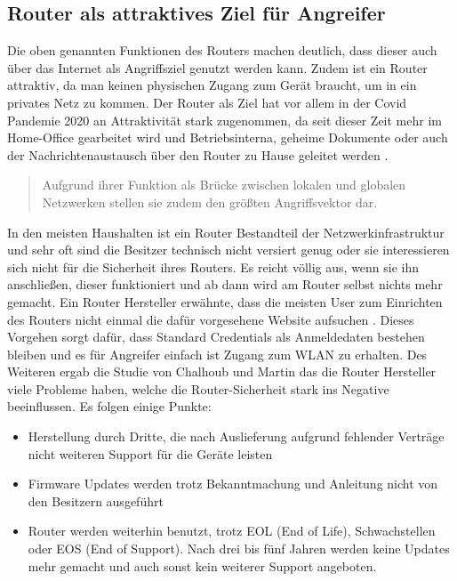 	\subsection{Router als attraktives Ziel für Angreifer}
	\label{sec:attractiv_target}
	Die oben genannten Funktionen des Routers machen deutlich, dass dieser auch
	über das Internet als Angriffsziel genutzt werden kann. Zudem ist ein Router
	attraktiv, da man keinen physischen Zugang zum Gerät braucht, um in ein 
	privates Netz zu kommen. Der Router als Ziel hat vor allem in der Covid 
	Pandemie 2020 an Attraktivität stark zugenommen, da seit dieser Zeit mehr im 
	Home-Office gearbeitet wird und Betriebsinterna, geheime Dokumente oder
	auch der Nachrichtenaustausch über den Router zu Hause geleitet werden
	\cite{chalhoub2023, schwarz2021}.
	\begin{quote}
		Aufgrund ihrer Funktion als Brücke zwischen lokalen und globalen 
		Netzwerken stellen sie zudem den größten Angriffsvektor dar.
		\cite{schwarz2021}
	\end{quote}
	In den meisten Haushalten ist ein Router Bestandteil der Netzwerkinfrastruktur und sehr oft sind 
	die Besitzer technisch nicht versiert genug oder sie interessieren sich 
	nicht für die Sicherheit ihres Routers. Es reicht völlig aus, wenn sie 
	ihn anschließen, dieser funktioniert und ab dann wird am Router selbst
	nichts mehr gemacht. Ein Router Hersteller erwähnte, dass die meisten User zum 
	Einrichten des Routers nicht einmal die dafür vorgesehene Website 
	aufsuchen \cite[S.285, Kapitel 4.4.3]{chalhoub2023}. 
	Dieses Vorgehen sorgt dafür, dass Standard Credentials als Anmeldedaten 
	bestehen bleiben und es für Angreifer einfach ist Zugang zum WLAN zu erhalten.
	Des Weiteren ergab die Studie von Chalhoub und Martin \cite{chalhoub2023}
	das die Router Hersteller viele Probleme haben, welche die Router-Sicherheit
	stark ins Negative beeinflussen. Es folgen einige Punkte:
	\begin{itemize}
		\item{Herstellung durch Dritte, die nach Auslieferung aufgrund
		fehlender Verträge nicht weiteren Support für die Geräte leisten}
		\item{Firmware Updates werden trotz Bekanntmachung und Anleitung
		nicht von den Besitzern ausgeführt}
		\item{Router werden weiterhin benutzt, trotz EOL (End of Life), 
		Schwachstellen oder EOS (End of Support). Nach drei bis fünf Jahren
		werden keine Updates mehr gemacht und auch sonst kein weiterer Support 
		angeboten.}
	\end{itemize}
